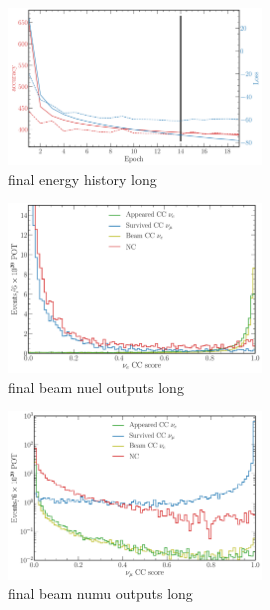 \begin{figure} %
    \includegraphics[width=0.6\textwidth]{diagrams/7-cvn/chipsnet/final_energy_history.pdf}
    \caption[final energy history short]
    {final energy history long}
    \label{fig:final_energy_history}
\end{figure}

\begin{figure} %
    \includegraphics[width=0.6\textwidth]{diagrams/7-cvn/chipsnet/final_beam_nuel_outputs.pdf}
    \caption[final beam nuel outputs short]
    {final beam nuel outputs long}
    \label{fig:final_beam_nuel_outputs}
\end{figure}

\begin{figure} %
    \includegraphics[width=0.6\textwidth]{diagrams/7-cvn/chipsnet/final_beam_numu_outputs.pdf}
    \caption[final beam numu outputs short]
    {final beam numu outputs long}
    \label{fig:final_beam_numu_outputs}
\end{figure}

